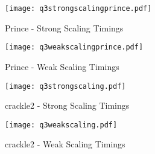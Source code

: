 \documentclass[10pt]{article}
\begin{document}
\lipsum

\begin{figure}[!h]
    \centering
    \begin{minipage}{0.45\textwidth}
        \centering
        \texttt{[image: q3strongscalingprince.pdf]} %
        \caption{Prince - Strong Scaling Timings}
        \label{fig5}
    \end{minipage}\hfill
         \begin{minipage}{0.45\textwidth}
        \centering
        \texttt{[image: q3weakscalingprince.pdf]} %
        \caption{Prince - Weak Scaling Timings}
        \label{fig6}
    \end{minipage}

    \centering
    \begin{minipage}{0.45\textwidth}
        \centering
        \texttt{[image: q3strongscaling.pdf]} %
        \caption{crackle2 - Strong Scaling Timings}
        \label{fig7}
    \end{minipage}\hfill
         \begin{minipage}{0.45\textwidth}
        \centering
        \texttt{[image: q3weakscaling.pdf]} %
        \caption{crackle2 - Weak Scaling Timings}
        \label{fig8}
    \end{minipage}
\end{figure}

\lipsum
\end{document}
